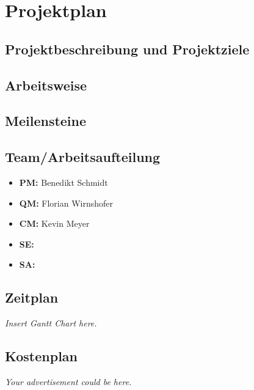 \documentclass[12pt]{article}
\begin{document}
\section{Projektplan}
\subsection{Projektbeschreibung und Projektziele}

\subsection{Arbeitsweise}

\subsection{Meilensteine}

\subsection{Team/Arbeitsaufteilung}

\begin{itemize}
	\item \textbf{PM:} Benedikt Schmidt
	\item \textbf{QM:} Florian Wirnshofer
	\item \textbf{CM:} Kevin Meyer
	\item \textbf{SE:} 
	\item \textbf{SA:} 
\end{itemize}

\subsection{Zeitplan}
\textit{Insert Gantt Chart here.}

\subsection{Kostenplan}
\textit{Your advertisement could be here.}
\end{document}
